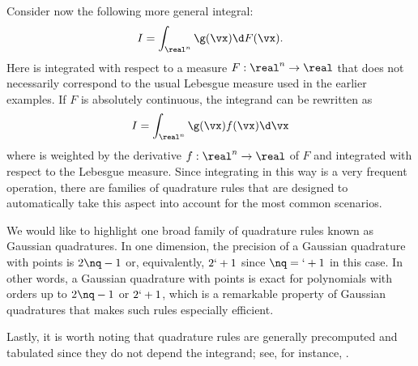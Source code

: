Consider now the following more general integral:
\[
  I = \int_{\real^n} \g(\vx) \d F(\vx).
\]
Here \g is integrated with respect to a measure $F: \real^n \to \real$
\cite{durrett2010} that does not necessarily correspond to the usual Lebesgue
measure used in the earlier examples. If $F$ is absolutely continuous, the
integrand can be rewritten as
\[
  I = \int_{\real^n} \g(\vx) f(\vx) \d \vx
\]
where \g is weighted by the derivative $f: \real^n \to \real$ of $F$ and
integrated with respect to the Lebesgue measure. Since integrating in this way
is a very frequent operation, there are families of quadrature rules that are
designed to automatically take this aspect into account for the most common
scenarios.

We would like to highlight one broad family of quadrature rules known as
Gaussian quadratures. In one dimension, the precision of a Gaussian quadrature
with \nq points is $2 \nq - 1$ \cite{heiss2008} or, equivalently, $2 \lq + 1$
since $\nq = \lq + 1$ in this case. In other words, a Gaussian quadrature with
\nq points is exact for polynomials with orders up to $2 \nq - 1$ or $2 \lq +
1$, which is a remarkable property of Gaussian quadratures that makes such rules
especially efficient.

Lastly, it is worth noting that quadrature rules are generally precomputed and
tabulated since they do not depend the integrand; see, for instance,
\cite{burkardt}.
